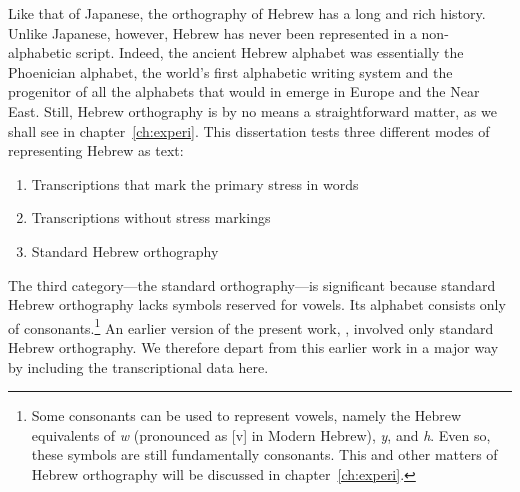 Like that of Japanese, the orthography of Hebrew has a long and rich history. Unlike Japanese, however, Hebrew has never been represented in a non-alphabetic script. Indeed, the ancient Hebrew alphabet was essentially the Phoenician alphabet, the world's first alphabetic writing system and the progenitor of all the alphabets that would in emerge in Europe and the Near East. Still, Hebrew orthography is by no means a straightforward matter, as we shall see in chapter~\ref{ch:experi}.
This dissertation tests three different modes of representing Hebrew as text:
\begin{enumerate}
\item Transcriptions that mark the primary stress in words
\item Transcriptions without stress markings 
\item Standard Hebrew orthography 
\end{enumerate} 
The third category---the standard orthography---is significant because standard Hebrew 
orthography lacks symbols reserved for vowels. Its alphabet consists only of consonants.\footnote{Some consonants can be used to represent vowels, namely the Hebrew equivalents of \textit{w} (pronounced as [v] in Modern Hebrew), \textit{y}, and \textit{h}. Even so, these symbols are still fundamentally consonants. This and other matters of Hebrew orthography will be discussed in chapter~\ref{ch:experi}.} An earlier version of the present work, \citet{meyer-and-dickinson:2016}, involved only standard Hebrew orthography. We therefore depart from this earlier work in a major way by including the transcriptional data here. 

